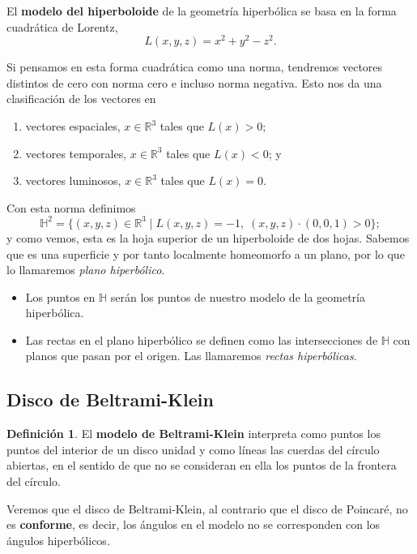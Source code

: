 \documentclass{article}
\theoremstyle{plain}
\theoremstyle{definition}
\newtheorem{definition}{Definición}
\theoremstyle{remark}
\begin{document}
El \textbf{modelo del hiperboloide} de la geometría hiperbólica se
basa en la forma cuadrática de Lorentz,
\[L(x,y,z)=x^2+y^2-z^2.\]

Si pensamos en esta forma cuadrática como una norma, tendremos vectores
distintos de cero con norma cero e incluso norma negativa. Esto nos da
una clasificación de los vectores en

\begin{enumerate}
\item vectores espaciales, $x\in\mathbb{R}^3$ tales que $L(x)>0$;
\item vectores temporales, $x\in\mathbb{R}^3$ tales que $L(x)<0$; y
\item vectores luminosos, $x\in\mathbb{R}^3$ tales que $L(x)=0$.
\end{enumerate}

Con esta norma definimos
\[\mathbb{H}^2=\{(x,y,z)\in\mathbb{R}^3 \mid L(x,y,z)=-1,\; (x,y,z) \cdot (0,0,1) > 0 \};\]
y como vemos, esta es la hoja superior de un hiperboloide de dos
hojas. Sabemos que es una superficie y por tanto localmente
homeomorfo a un plano, por lo que lo llamaremos \textit{plano hiperbólico}.

\begin{itemize}
\item Los puntos en $\mathbb{H}$ serán los puntos de nuestro modelo
  de la geometría hiperbólica.
\item Las rectas en el plano hiperbólico se definen como las intersecciones
  de $\mathbb{H}$ con planos que pasan por el origen. Las llamaremos
  \textit{rectas hiperbólicas}.
\end{itemize}


\subsection{Disco de Beltrami-Klein}

\begin{definition}
  El \textbf{modelo de Beltrami-Klein} interpreta como puntos los puntos
  del interior de un disco unidad y como líneas las cuerdas del círculo
  abiertas, en el sentido de que no se consideran en ella los puntos de
  la frontera del círculo.
\end{definition}

Veremos que el disco de Beltrami-Klein, al contrario que el disco de
Poincaré, no es \textbf{conforme}, es decir, los ángulos en el modelo
no se corresponden con los ángulos hiperbólicos.
\end{document}
